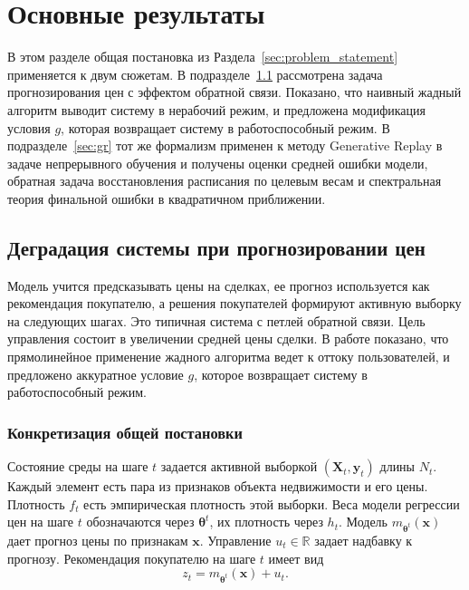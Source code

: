 \documentclass[a4paper,14pt,oneside,openany]{extarticle}
\newcommand{\bX}{\mathbf{X}}
\newcommand{\bx}{\mathbf{x}}
\newcommand{\by}{\mathbf{y}}
\newcommand{\bbR}{\mathbb{R}}
\newcommand{\btheta}{\boldsymbol{\theta}}
\begin{document}

\newpage
\section{Основные результаты}\label{sec:main_results}

В этом разделе общая постановка из Раздела~\ref{sec:problem_statement} применяется к двум сюжетам. В подразделе~\ref{sec:degradation} рассмотрена задача прогнозирования цен с эффектом обратной связи. Показано, что наивный жадный алгоритм выводит систему в нерабочий режим, и предложена модификация условия $g$, которая возвращает систему в работоспособный режим. В подразделе~\ref{sec:gr} тот же формализм применен к методу Generative Replay в задаче непрерывного обучения и получены оценки средней ошибки модели, обратная задача восстановления расписания по целевым весам и спектральная теория финальной ошибки в квадратичном приближении.

\subsection{Деградация системы при прогнозировании цен}\label{sec:degradation}

Модель учится предсказывать цены на сделках, ее прогноз используется как рекомендация покупателю, а решения покупателей формируют активную выборку на следующих шагах. Это типичная система с петлей обратной связи. Цель управления состоит в увеличении средней цены сделки. В работе показано, что прямолинейное применение жадного алгоритма ведет к оттоку пользователей, и предложено аккуратное условие $g$, которое возвращает систему в работоспособный режим.

\subsubsection{Конкретизация общей постановки}

Состояние среды на шаге $t$ задается активной выборкой $(\bX_t, \by_t)$ длины $N_t$. Каждый элемент есть пара из признаков объекта недвижимости и его цены. Плотность $f_t$ есть эмпирическая плотность этой выборки. Веса модели регрессии цен на шаге $t$ обозначаются через $\btheta^t$, их плотность через $h_t$. Модель $m_{\btheta^t}(\bx)$ дает прогноз цены по признакам $\bx$. Управление $u_t \in \bbR$ задает надбавку к прогнозу. Рекомендация покупателю на шаге $t$ имеет вид
\begin{equation}
    z_t = m_{\btheta^t}(\bx) + u_t. \label{eq:price_rec}
\end{equation}
\end{document}
